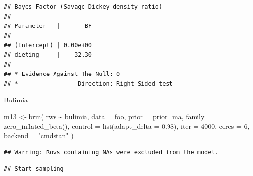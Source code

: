 \documentclass[
]{article}
\newenvironment{Shaded}{\begin{snugshade}}{\end{snugshade}}
\newcommand{\AttributeTok}[1]{\textcolor[rgb]{0.77,0.63,0.00}{#1}}
\newcommand{\DecValTok}[1]{\textcolor[rgb]{0.00,0.00,0.81}{#1}}
\newcommand{\FloatTok}[1]{\textcolor[rgb]{0.00,0.00,0.81}{#1}}
\newcommand{\FunctionTok}[1]{\textcolor[rgb]{0.00,0.00,0.00}{#1}}
\newcommand{\NormalTok}[1]{#1}
\newcommand{\OtherTok}[1]{\textcolor[rgb]{0.56,0.35,0.01}{#1}}
\newcommand{\SpecialCharTok}[1]{\textcolor[rgb]{0.00,0.00,0.00}{#1}}
\newcommand{\StringTok}[1]{\textcolor[rgb]{0.31,0.60,0.02}{#1}}
\begin{document}
\begin{verbatim}
## Bayes Factor (Savage-Dickey density ratio)
## 
## Parameter   |       BF
## ----------------------
## (Intercept) | 0.00e+00
## dieting     |    32.30
## 
## * Evidence Against The Null: 0
## *                 Direction: Right-Sided test
\end{verbatim}

Bulimia

\begin{Shaded}
\begin{Highlighting}[]
\NormalTok{m13 }\OtherTok{\textless{}{-}} \FunctionTok{brm}\NormalTok{(}
\NormalTok{  rws }\SpecialCharTok{\textasciitilde{}}\NormalTok{ bulimia,}
  \AttributeTok{data =}\NormalTok{ foo, }
  \AttributeTok{prior =}\NormalTok{ prior\_ma,}
  \AttributeTok{family =} \FunctionTok{zero\_inflated\_beta}\NormalTok{(),}
  \AttributeTok{control =} \FunctionTok{list}\NormalTok{(}\AttributeTok{adapt\_delta =} \FloatTok{0.98}\NormalTok{),}
  \AttributeTok{iter =} \DecValTok{4000}\NormalTok{,}
  \AttributeTok{cores =} \DecValTok{6}\NormalTok{,}
  \AttributeTok{backend =} \StringTok{"cmdstan"}
\NormalTok{)}
\end{Highlighting}
\end{Shaded}

\begin{verbatim}
## Warning: Rows containing NAs were excluded from the model.
\end{verbatim}

\begin{verbatim}
## Start sampling
\end{verbatim}
\end{document}
